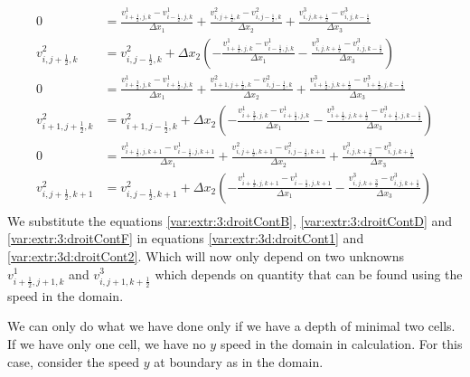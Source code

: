 \begin{align}
\label{var:extr:3:droitContA}
	0&=\frac{v^{1}_{i+\frac{1}{2},j,k}-v^{1}_{i-\frac{1}{2},j,k}}{\Delta x_{1}}+\frac{v^{2}_{i,j+\frac{1}{2},k}-v^{2}_{i,j-\frac{1}{2},k}}{\Delta x_2}+\frac{v^{3}_{i,j,k+\frac{1}{2}}-v^{3}_{i,j,k-\frac{1}{2}}}{\Delta x_{3}}\\
\label{var:extr:3:droitContB}
	v^{2}_{i,j+\frac{1}{2},k}&=v^{2}_{i,j-\frac{1}{2},k}+\Delta x_{2}\left(-\frac{v^{1}_{i+\frac{1}{2},j,k}-v^{1}_{i-\frac{1}{2},j,k}}{\Delta x_{1}}-\frac{v^{3}_{i,j,k+\frac{1}{2}}-v^{3}_{i,j,k-\frac{1}{2}}}{\Delta x_{3}}\right)\\
\label{var:extr:3:droitContC}
	0&=\frac{v^{1}_{i+\frac{3}{2},j,k}-v^{1}_{i+\frac{1}{2},j,k}}{\Delta x_{1}}+\frac{v^{2}_{i+1,j+\frac{1}{2},k}-v^{2}_{i,j-\frac{1}{2},k}}{\Delta x_2}+\frac{v^{3}_{i+\frac{1}{2},j,k+\frac{1}{2}}-v^{3}_{i+\frac{1}{2},j,k-\frac{1}{2}}}{\Delta x_{3}}\\
\label{var:extr:3:droitContD}
	v^{2}_{i+1,j+\frac{1}{2},k}&=v^{2}_{i+1,j-\frac{1}{2},k}+\Delta x_{2}\left(-\frac{v^{1}_{i+\frac{3}{2},j,k}-v^{1}_{i+\frac{1}{2},j,k}}{\Delta x_{1}}-\frac{v^{3}_{i+\frac{1}{2},j,k+\frac{1}{2}}-v^{3}_{i+\frac{1}{2},j,k-\frac{1}{2}}}{\Delta x_{3}}\right)\\
	\label{var:extr:3:droitContE}
	0&=\frac{v^{1}_{i+\frac{1}{2},j,k+1}-v^{1}_{i-\frac{1}{2},j,k+1}}{\Delta x_{1}}+\frac{v^{2}_{i,j+\frac{1}{2},k+1}-v^{2}_{i,j-\frac{1}{2},k+1}}{\Delta x_2}+\frac{v^{3}_{i,j,k+\frac{3}{2}}-v^{3}_{i,j,k+\frac{1}{2}}}{\Delta x_{3}}\\
\label{var:extr:3:droitContF}
	v^{2}_{i,j+\frac{1}{2},k+1}&=v^{2}_{i,j-\frac{1}{2},k+1}+\Delta x_{2}\left(-\frac{v^{1}_{i+\frac{1}{2},j,k+1}-v^{1}_{i-\frac{1}{2},j,k+1}}{\Delta x_{1}}-\frac{v^{3}_{i,j,k+\frac{3}{2}}-v^{3}_{i,j,k+\frac{1}{2}}}{\Delta x_{3}}\right)\\
\end{align}
We substitute the  equations \ref{var:extr:3:droitContB}, \ref{var:extr:3:droitContD} and \ref{var:extr:3:droitContF}  in equations \ref{var:extr:3d:droitCont1} and \ref{var:extr:3d:droitCont2}.
Which will now only depend on two unknowns $v^{1}_{i+\frac{1}{2},j+1,k}$ and $v^{3}_{i,j+1,k+\frac{1}{2}}$ which depends on quantity that can be found using the speed in the domain.

We can only do what we have done only if we have a depth of minimal two cells.
If we have only one cell, we have no $y$ speed in the domain in calculation.
For this case, consider the speed $y$ at boundary as in the domain.

